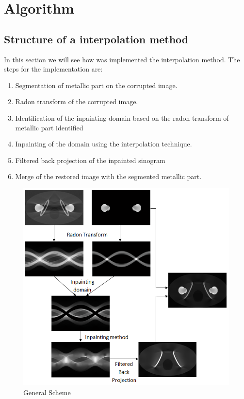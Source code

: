 \chapter{Algorithm}
\section{Structure of a interpolation method}

In this section we will see how was implemented the interpolation method. The steps for the implementation are:

\begin{enumerate}
\item	Segmentation of metallic part on the corrupted image. 
\item	Radon transform of the corrupted image. 
\item	Identification of the inpainting domain based on the radon transform of metallic part identified 
\item	Inpainting of the domain using the interpolation technique.   \item	Filtered back projection of the inpainted sinogram 
\item	Merge of the restored image with the segmented metallic part. 
\end{enumerate}

\begin{figure}[h]
\centering
\includegraphics[scale=0.75]{img/schema}
\caption{{General Scheme}}\label{schema_fig}
\end{figure}

